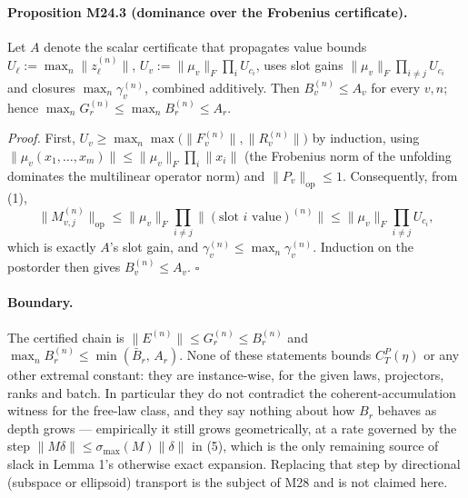 \paragraph{Proposition M24.3 (dominance over the Frobenius certificate).}
Let $A$ denote the scalar certificate that propagates value bounds
$U_\ell:=\max_n\|z_\ell^{(n)}\|$, $U_v:=\|\mu_v\|_F\prod_iU_{c_i}$, uses slot
gains $\|\mu_v\|_F\prod_{i\ne j}U_{c_i}$ and closures $\max_n\gamma_v^{(n)}$,
combined additively. Then $B_v^{(n)}\le A_v$ for every $v,n$; hence
$\max_nG_r^{(n)}\le\max_nB_r^{(n)}\le A_r$.

\emph{Proof.} First, $U_v\ge\max_n\max\bigl(\|F_v^{(n)}\|,\|R_v^{(n)}\|\bigr)$
by induction, using $\|\mu_v(x_1,\dots,x_m)\|\le\|\mu_v\|_F\prod_i\|x_i\|$
(the Frobenius norm of the unfolding dominates the multilinear operator norm)
and $\|P_v\|_{\mathrm{op}}\le1$. Consequently, from (1),
\[
 \bigl\|M_{v,j}^{(n)}\bigr\|_{\mathrm{op}}
 \le\|\mu_v\|_F\prod_{i\ne j}\bigl\|(\text{slot }i\text{ value})^{(n)}\bigr\|
 \le\|\mu_v\|_F\prod_{i\ne j}U_{c_i},
\]
which is exactly $A$'s slot gain, and $\gamma_v^{(n)}\le\max_n\gamma_v^{(n)}$.
Induction on the postorder then gives $B_v^{(n)}\le A_v$. $\square$

\paragraph{Boundary.}
The certified chain is
$\|E^{(n)}\|\le G_r^{(n)}\le B_r^{(n)}$ and
$\max_nB_r^{(n)}\le\min(\bar B_r,\,A_r)$.
None of these statements bounds $C_T^P(\eta)$ or any other extremal constant:
they are instance-wise, for the given laws, projectors, ranks and batch. In
particular they do not contradict the coherent-accumulation witness for the
free-law class, and they say nothing about how $B_r$ behaves as depth grows
--- empirically it still grows geometrically, at a rate governed by the
step $\|M\delta\|\le\sigma_{\max}(M)\|\delta\|$ in (5), which is the only
remaining source of slack in Lemma 1's otherwise exact expansion.
Replacing that step by directional (subspace or ellipsoid) transport is the
subject of M28 and is not claimed here.
